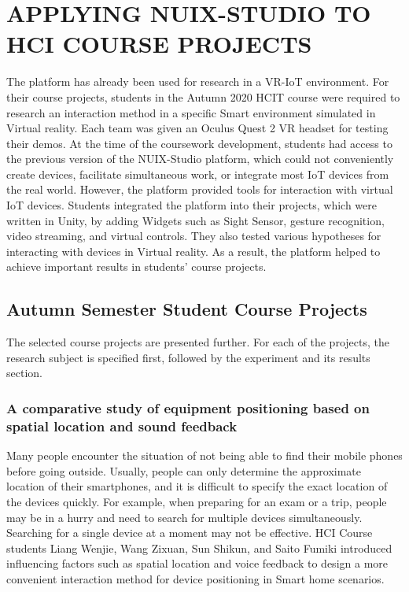 
\chapter{\MakeUppercase{Applying NUIX-Studio to HCI Course Projects}}

The platform has already been used for research in a VR-IoT environment.
For their course projects, students in the Autumn 2020 HCIT course were required to research an interaction method in a specific Smart environment simulated in Virtual reality. Each team was given an Oculus Quest 2 VR headset for testing their demos. At the time of the coursework development, students had access to the previous version of the NUIX-Studio platform, which could not conveniently create devices, facilitate simultaneous work, or integrate most IoT devices from the real world. However, the platform provided tools for interaction with virtual IoT devices. Students integrated the platform into their projects, which were written in Unity, by adding Widgets such as Sight Sensor, gesture recognition, video streaming, and virtual controls. They also tested various hypotheses for interacting with devices in Virtual reality. As a result, the platform helped to achieve important results in students' course projects. 

\section{Autumn Semester Student Course Projects}

The selected course projects are presented further. For each of the projects, the research subject is specified first, followed by the experiment and its results section.


\subsection{A comparative study of equipment positioning based on spatial location and sound feedback}

Many people encounter the situation of not being able to find their mobile phones before going outside. Usually, people can only determine the approximate location of their smartphones, and it is difficult to specify the exact location of the devices quickly. For example, when preparing for an exam or a trip, people may be in a hurry and need to search for multiple devices simultaneously. Searching for a single device at a moment may not be effective. HCI Course students Liang Wenjie, Wang Zixuan, Sun Shikun, and Saito Fumiki introduced influencing factors such as spatial location and voice feedback to design a more convenient interaction method for device positioning in Smart home scenarios. 


